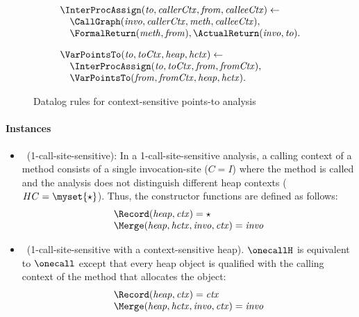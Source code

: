 {\begin{figure}[t]
\[\begin{array}{l}
  \InterProcAssign({\it to}, {\it callerCtx}, {\it from}, {\it calleeCtx})
  \leftarrow\\
  \quad \CallGraph({\it invo}, {\it callerCtx}, {\it meth}, {\it calleeCtx}), \\
  \quad \FormalReturn({\it meth}, {\it from}),
  \ActualReturn({\it invo}, {\it to}). \\[1em]

    \VarPointsTo({\it to}, {\it toCtx}, {\it heap}, {\it hctx}) \leftarrow \\
    \quad \InterProcAssign({\it to}, {\it toCtx}, {\it from}, {\it fromCtx}), \\
    \quad \VarPointsTo({\it from}, {\it fromCtx}, {\it heap}, {\it hctx}). 

  \end{array}
\]
\caption{Datalog rules for context-sensitive points-to analysis}
\label{fig:baseline-rules}
\end{figure}


\paragraph{Instances}

\begin{itemize}

\item \onecall~(1-call-site-sensitive): In a 1-call-site-sensitive
  analysis, a calling context of a method consists of a single invocation-site
  ($C = I$) where the method is called and the analysis does not distinguish different heap
  contexts ($HC = \myset{\star}$). Thus, the constructor functions are
  defined as follows: 
\[
\begin{array}{l}
\Record ({\it heap}, {\it ctx}) = \star\\
\Merge ({\it heap, hctx, invo, ctx}) = {\it invo} \\
\end{array}
\]

\item {\onecallH~(1-call-site-sensitive with a context-sensitive
    heap)}. $\onecallH$ is equivalent to $\onecall$ except that 
every heap object is qualified with the calling context of the method
that allocates the object: 
\[
\begin{array}{l}
\Record ({\it heap}, {\it ctx}) = {\it ctx}\\
\Merge ({\it heap, hctx, invo, ctx}) = {\it invo} \\
\end{array}
\]


\end{itemize}}
